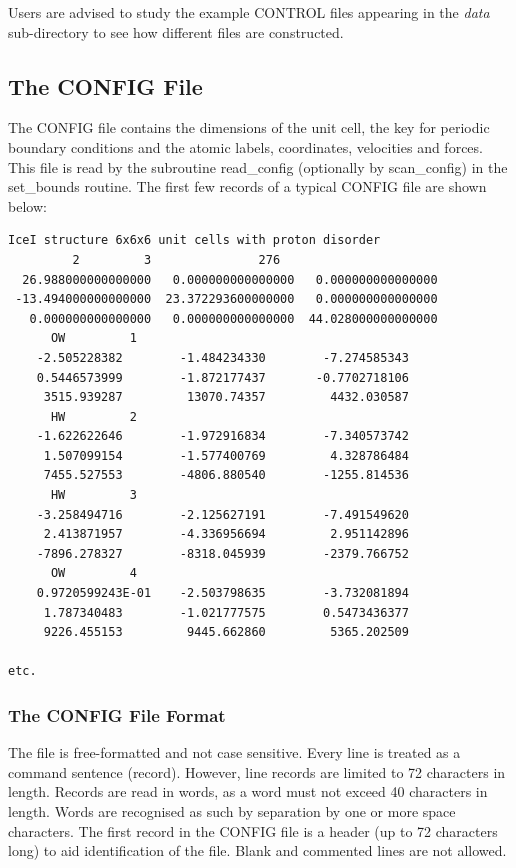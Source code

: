 \noindent Users are advised to study the example CONTROL files
appearing in the {\em data} sub-directory to see how different
files are constructed.

\subsection{The CONFIG File}
\label{config-file}

The CONFIG file contains the dimensions of the unit cell, the key
for periodic boundary conditions and the atomic labels,
coordinates, velocities and forces.  This file is read by the
subroutine {\sc read\_config} (optionally by {\sc scan\_config})
in the {\sc set\_bounds} routine.  The first few records of a
typical CONFIG file are shown below:

\begin{lstlisting}
IceI structure 6x6x6 unit cells with proton disorder
         2         3               276
  26.988000000000000   0.000000000000000   0.000000000000000
 -13.494000000000000  23.372293600000000   0.000000000000000
   0.000000000000000   0.000000000000000  44.028000000000000
      OW         1
    -2.505228382        -1.484234330        -7.274585343
    0.5446573999        -1.872177437       -0.7702718106
     3515.939287         13070.74357         4432.030587
      HW         2
    -1.622622646        -1.972916834        -7.340573742
     1.507099154        -1.577400769         4.328786484
     7455.527553        -4806.880540        -1255.814536
      HW         3
    -3.258494716        -2.125627191        -7.491549620
     2.413871957        -4.336956694         2.951142896
    -7896.278327        -8318.045939        -2379.766752
      OW         4
    0.9720599243E-01    -2.503798635        -3.732081894
     1.787340483        -1.021777575        0.5473436377
     9226.455153         9445.662860         5365.202509

etc.
\end{lstlisting}

\subsubsection{The CONFIG File Format}

The file is free-formatted and not case sensitive.  Every line is
treated as a command sentence (record).  However, line records are
limited to 72 characters in length.  Records are read in words,
as a word must not exceed 40 characters in length.  Words are
recognised as such by separation by one or more space characters.
The first record in the CONFIG file is a header (up to 72
characters long) to aid identification of the file.  Blank and
commented lines are not allowed.

